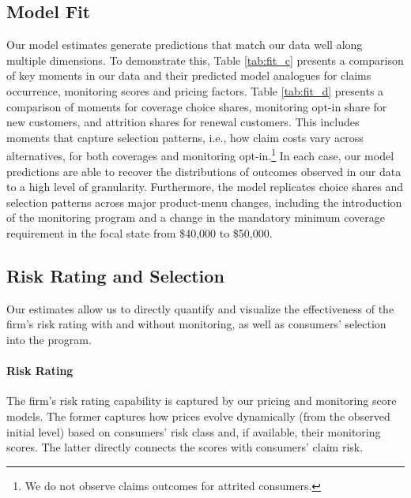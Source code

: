 \subsection{Model Fit}

Our model estimates generate predictions that match our data well along multiple dimensions. To demonstrate this, Table \ref{tab:fit_c} presents a comparison of key moments in our data and their predicted model analogues for claims occurrence, monitoring scores and pricing factors. Table \ref{tab:fit_d} presents a comparison of moments for coverage choice shares, monitoring opt-in share for new customers, and attrition shares for renewal customers. This includes moments that capture selection patterns, i.e., how claim costs vary across alternatives, for both coverages and monitoring opt-in.\footnote{We do not observe claims outcomes for attrited consumers.} In each case, our model predictions are able to recover the distributions of outcomes observed in our data to a high level of granularity.
Furthermore, the model replicates choice shares and selection patterns across major product-menu changes, including the introduction of the monitoring program and a change in the mandatory minimum coverage requirement in the focal state from \$40,000 to \$50,000.

\subsection{Risk Rating and Selection}

Our estimates allow us to directly quantify and visualize the effectiveness of the firm's risk rating with and without monitoring, as well as consumers' selection into the program.

\clearpage
\enlargethispage{3em}
\begingroup
\let\oldtable\table
\def\table[#1]{\oldtable[H]}
\vspace{-2em}
\endgroup
\clearpage

\paragraph{Risk Rating}

The firm's risk rating capability is captured by our pricing and monitoring score models. The former captures how prices evolve dynamically (from the observed initial level) based on consumers' risk class and, if available, their monitoring scores. The latter directly connects the scores with consumers' claim risk.

